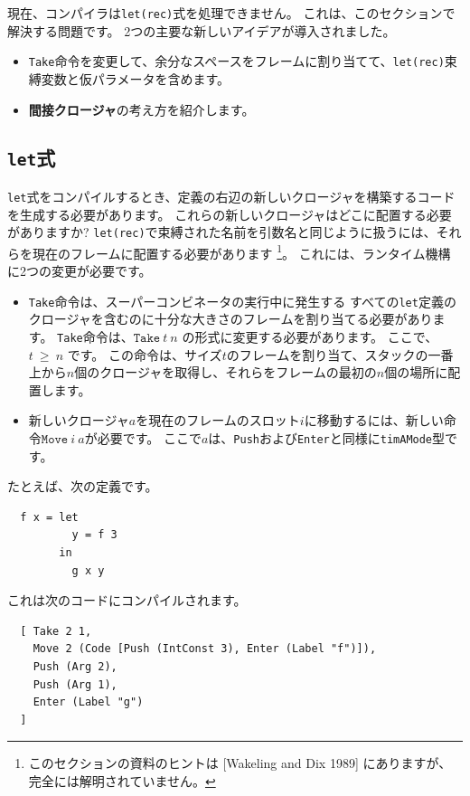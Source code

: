 \documentclass{jbook}
\begin{document}
現在、コンパイラは\texttt{let(rec)}式を処理できません。
これは、このセクションで解決する問題です。
2つの主要な新しいアイデアが導入されました。

\begin{itemize}
	\item \texttt{Take}命令を変更して、余分なスペースをフレームに割り当てて、\texttt{let(rec)}束縛変数と仮パラメータを含めます。
	\item \textbf{間接クロージャ}の考え方を紹介します。
\end{itemize}

\subsection{\texttt{let}式}

\texttt{let}式をコンパイルするとき、定義の右辺の新しいクロージャを構築するコードを生成する必要があります。
これらの新しいクロージャはどこに配置する必要がありますか?
\texttt{let(rec)}で束縛された名前を引数名と同じように扱うには、それらを現在のフレームに配置する必要があります
\footnote{このセクションの資料のヒントは [Wakeling and Dix 1989] にありますが、完全には解明されていません。}。
これには、ランタイム機構に2つの変更が必要です。

\begin{itemize}
	\item \texttt{Take}命令は、スーパーコンビネータの実行中に発生する
	      すべての\texttt{let}定義のクロージャを含むのに十分な大きさのフレームを割り当てる必要があります。
	      \texttt{Take}命令は、$\texttt{Take} ~ t ~ n$ の形式に変更する必要があります。
	      ここで、$t ~ \ge ~ n$ です。
	      この命令は、サイズ$t$のフレームを割り当て、スタックの一番上から$n$個のクロージャを取得し、それらをフレームの最初の$n$個の場所に配置します。
	\item 新しいクロージャ$a$を現在のフレームのスロット$i$に移動するには、新しい命令$\texttt{Move} ~ i ~ a$が必要です。
	      ここで$a$は、\texttt{Push}および\texttt{Enter}と同様に\texttt{timAMode}型です。
\end{itemize}

たとえば、次の定義です。

\begin{verbatim}
  f x = let
          y = f 3
        in
          g x y
\end{verbatim}

これは次のコードにコンパイルされます。

\begin{verbatim}
  [ Take 2 1,
    Move 2 (Code [Push (IntConst 3), Enter (Label "f")]),
    Push (Arg 2),
    Push (Arg 1),
    Enter (Label "g")
  ]
\end{verbatim}
\end{document}
